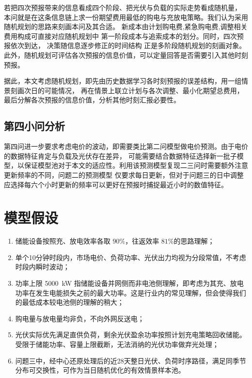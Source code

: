 \documentclass[zihao=-4,a4paper,fontset=none]{ctexart}
\begin{document}
若把四次预报带来的信息看成四个阶段、把光伏与负载的实际走势看成随机量，
本问就是在这条信息链上求一份期望费用最低的购电与充放电策略。我们认为采用随机规划的思路来刻画本问及其合适。
新成本由计划购电费,紧急购电费,调整相关费用构成可直接对应随机规划中
第一阶段成本与追索成本的划分。同时，四次预报依次到达，
决策随信息逐步修正的时间结构
正是多阶段随机规划的刻画对象。此外，随机规划可评估各次预报的信息价值，可以定量回答是否需要引入其他时刻预报。

据此，本文考虑随机规划，即先由历史数据学习各时刻预报的误差结构，用一组情景刻画次日的可能情况，
再在情景上联立计划与各次调整、最小化期望总费用，
最后分解各次预报的信息价值，分析其他时刻汇报必要性。

\subsection{第四小问分析}

第四问进一步要求考虑电价的波动，即需要类比第二问模型做电价预测。由于电价的数据特征肯定与负载及光伏存在差异，
可能需要结合数据特征选择新一批子模型，以保证模型池对于本文的适应性。利用该预测模型复现二三问时需要额外注意更新频率的不同，问题二的预测模型
仅要求每日更新，但对于问题三的日中调整应选择每六个小时更新的频率可以更好在预报时捕捉最近小时的数值特征。
\newpage
\section{模型假设}

\begin{enumerate}
\item 储能设备按照充、放电效率各取 $90\%$，往返效率 $81\%$的思路理解；
\item 单个10分钟时段内，市场电价、负荷功率、光伏出力均视为分段常值，不考虑时段内瞬时波动；
\item 功率上限 5000~kW 指储能设备并网侧而非电池侧理解，即考虑为其充、放电功率在发生电能损失之前的最大功率。这是行业内的常见理解，但会使得我们的最低成本较电池侧的理解的稍大；
\item 购电量与放电量均非负，不向外网反送电；
\item 光伏实际优先满足直供负荷，剩余光伏盈余功率按照计划充电策略回收储能。受限于储能功率、容量上限截断，无法消纳的光伏功率做弃光处理；
\item 问题三中，经中心还原处理后的近28天整日光伏、负荷时序路径，满足同季节分布可交换性，可作为当日随机优化的有效情景样本池。
\end{enumerate}
\end{document}
